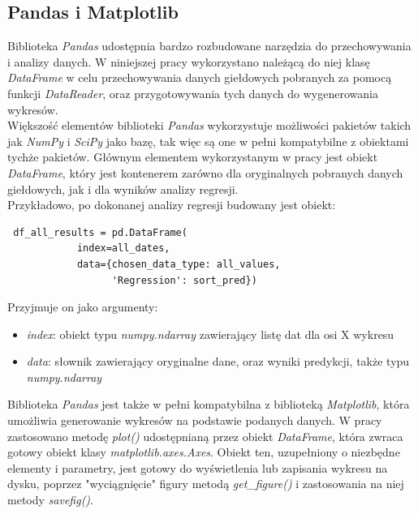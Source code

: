 \subsection{Pandas i Matplotlib}
Biblioteka \textit{Pandas} udostępnia bardzo rozbudowane narzędzia do przechowywania i analizy danych.
W niniejszej pracy wykorzystano należącą do niej klasę \textit{DataFrame} w celu przechowywania danych giełdowych pobranych za pomocą funkcji \textit{DataReader}, oraz przygotowywania tych danych do wygenerowania wykresów.\\

Większość elementów biblioteki \textit{Pandas} wykorzystuje możliwości pakietów takich jak \textit{NumPy} i \textit{SciPy} jako bazę, tak więc są one w pełni kompatybilne z obiektami tychże pakietów.
Głównym elementem wykorzystanym w pracy jest obiekt \textit{DataFrame}, który jest kontenerem zarówno dla oryginalnych pobranych danych giełdowych, jak i dla wyników analizy regresji.\\
Przykładowo, po dokonanej analizy regresji budowany jest obiekt:
\begin{lstlisting}
 df_all_results = pd.DataFrame(
            index=all_dates,
            data={chosen_data_type: all_values,
                  'Regression': sort_pred})
\end{lstlisting}

Przyjmuje on jako argumenty:
\begin{itemize}
 \item \textit{index}: obiekt typu \textit{numpy.ndarray} zawierający listę dat dla osi X wykresu
 \item \textit{data}: słownik zawierający oryginalne dane, oraz wyniki predykcji, także typu \textit{numpy.ndarray}
\end{itemize}

Biblioteka \textit{Pandas} jest także w pełni kompatybilna z biblioteką \textit{Matplotlib}, która umożliwia generowanie wykresów na podstawie podanych danych.
W pracy zastosowano metodę \textit{plot()} udostępnianą przez obiekt \textit{DataFrame}, która zwraca gotowy obiekt klasy \textit{matplotlib.axes.Axes}.
Obiekt ten, uzupełniony o niezbędne elementy i parametry, jest gotowy do wyświetlenia lub zapisania wykresu na dysku, poprzez "wyciągnięcie" figury metodą \textit{get\_figure()} i zastosowania na niej metody \textit{savefig()}.\\

